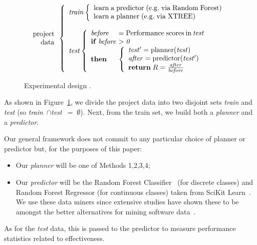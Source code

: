 \documentclass{sig-alternate}
\newcommand{\bi}{\begin{itemize}}
\newcommand{\ei}{\end{itemize}}
\newcommand{\fig}[1]{Figure~\ref{fig:#1}}
\begin{document}
 \begin{figure}[!h]
{\small 
\[
\begin{array}{r} 
\mathrm{project}\\
\mathrm{data}
\end{array} 
\left\{\begin{array}{l}\mathit{train}
        \left\{\begin{array}{l}
                \mathrm{learn\;a\;}\mathrm{predictor\;}\mathrm{(e.g.\;via \;Random\;Forest)}\\
                \mathrm{learn\;a\;}\mathrm{planner\;}\mathrm{(e.g.\;via \; XTREE)}
              \end{array}\right.
       \\
      ~\\
\mathit{test}  
    \left\{\begin{array}{l@{~}l}
           \mathit{before}& =\mathrm{Performance\; scores \hspace{2pt} in \hspace{2pt}}\mathit{test}\\
           \mathrm{\bf if\;}\mathit{before} & >  \mathit{0}\\
           \mathrm{\bf then} &
           \left\{
            \begin{array}{l}
                \mathit{test'} = \mathrm{planner}(\mathit{test})\\
                \mathit{after} =\mathrm{predictor}(\mathit{test'})\\ 
                \mathrm{{\bf return}\;} R=\frac{\mathit{after}}{\mathit{before}}
            \end{array}
          \right.
   \end{array}\right.
\end{array} \right. 
\]}
 \caption{Experimental design .}\label{fig:design}
 \end{figure}

As shown in \fig{design}, we divide the
project data  into two disjoint sets {\em train} and {\em test}
(so \mbox{{\em train} $\cap ${\em test} $=\;\emptyset$}).
Next, from the train set, we build both a {\em planner} and
 a {\em  predictor}. 

Our general framework does not   commit to any particular choice of { planner} or { predictor} but, for the purposes of this paper:
\bi
\item Our {\em planner} will be one of Methods 1,2,3,4;
\item Our  {\em predictor} will be the Random Forest Classifier~\cite{Breiman2001} (for discrete classes) and Random Forest Regressor (for continuous classes) taken from  SciKit Learn~\cite{Pedregosa2012}.   We use these
data miners since extensive studies have shown these to be amongst the better alternatives for mining software data~\cite{lessmann}.
\ei
As for the {\em test} data, this is passed to the { predictor}
to measure performance statistics related to effectiveness. 
\end{document}

